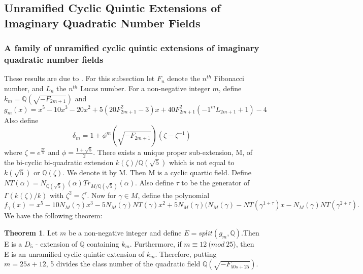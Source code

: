 \documentclass[12pt]{extarticle}
\newcommand{\Q}{\mathbb{Q}}
\newcommand{\<}{\langle}
\renewcommand{\>}{\rangle}
\theoremstyle{definition}
\newtheorem{theorem}{Theorem}
\begin{document}
\subsection{Unramified Cyclic Quintic Extensions of Imaginary Quadratic Number Fields}
\subsubsection{A family of unramified cyclic quintic extensions of imaginary quadratic number fields}
These results are due to \cite{KISH}. For this subsection let $F_n$ denote the $n^{th}$ Fibonacci number, and $L_n$ the $n^{th}$ Lucas number. For a non-negative integer $m$, define $k_m = \Q(\sqrt{-F_{2m+1}})$ and \begin{equation}
    g_m(x) = x^5 - 10x^3  -20x^2 + 
    5(20F^2_{2m+1} - 3)x
    + 40F^2_{2m+1}(-1^{m}L_{2m+1} + 1)- 4
\end{equation} 
Also define \begin{equation}
    \delta_m = 1+\phi^m(\sqrt{-F_{2m+1}})(\zeta-\zeta^{-1})
\end{equation} where $\zeta = e^{\frac{2\pi}{5}}$ and $\phi = \frac{1+\sqrt{5}}{2}$. There exists a unique proper sub-extension, M, of the bi-cyclic bi-quadratic
extension $k(\zeta)/\Q(\sqrt{5})$ which is not equal to $k(\sqrt{5})$ or $\Q(\zeta)$. We denote it by M. Then M is a cyclic quartic field. Define $NT(\alpha) = N_{\Q(\sqrt{5})}(\alpha)Tr_{M/\Q(\sqrt{5})}(\alpha)$. Also define $\tau$ to be the generator of $\Gamma(k(\zeta)/k)$ with $\zeta^2=\zeta^\tau$.
Now for $\gamma \in M$, define the polynomial \begin{equation}
    f_\gamma(x) = x^5 - 10N_M(\gamma)x^3 - 5N_M(\gamma)NT (\gamma)x^2
+ 5N_M(\gamma)(N_M(\gamma) - NT(\gamma^{1+\tau})x - N_M(\gamma)NT(\gamma^{2+\tau}) 
.
\end{equation}
We have the following theorem: \begin{theorem}
    Let $m$ be a non-negative integer and define $E = split(g_m,\Q)$.Then E is a $D_5$ - extension
of $\Q$ containing $k_m$. Furthermore, if $m \equiv 12 \:(mod\:25$), then E is an unramified cyclic quintic extension of $k_m$. Therefore, putting $m = 25s + 12$, 5 divides the class number of the quadratic field $\Q(\sqrt{-F_{50s+25}})$.
\end{theorem}
\end{document}

